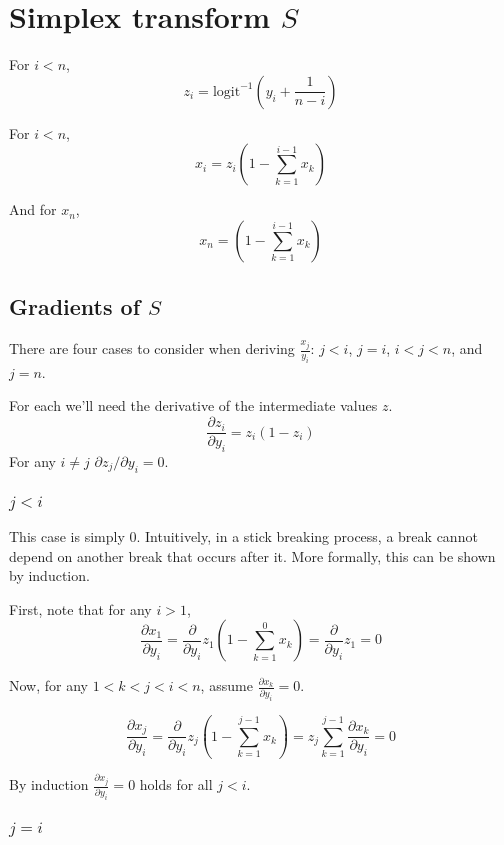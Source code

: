 \documentclass{article}
\begin{document}
\section{Simplex transform $S$}


For $i < n$,
$$z_i = \text{logit}^{-1}\left(y_i + \frac{1}{n - i}\right)$$

For $i < n$,
$$x_i = z_i \left(1 - \sum_{k=1}^{i-1} x_k \right)$$

And for $x_n$,
$$x_n = \left(1 - \sum_{k=1}^{i-1} x_k \right)$$


\subsection{Gradients of $S$}


There are four cases to consider when deriving $\frac{x_j}{y_i}$: $j < i$, $j =
i$, $i < j < n$, and  $j = n$.


For each we'll need the derivative of the intermediate values $z$.
\begin{equation}
\frac{\partial z_i}{\partial y_i} = z_i (1 - z_i)
\end{equation}
For any $i \neq j$ $\partial z_j / \partial y_i = 0$.


\subsubsection{$j < i$}
This case is simply 0. Intuitively, in a stick breaking process, a break cannot
depend on another break that occurs after it. More formally, this can be shown
by induction.

First, note that for any $i > 1$,
$$\frac{\partial x_1}{\partial y_i} = \frac{\partial}{\partial
y_i} z_1 \left(1 - \sum_{k=1}^0 x_k \right) = \frac{\partial}{\partial y_i} z_1 = 0$$

Now, for any $1 < k < j < i < n$, assume $\frac{\partial x_k}{\partial y_i} = 0$.

$$\frac{\partial x_j}{\partial y_i} = \frac{\partial}{\partial y_i} z_j \left(1 -
\sum_{k=1}^{j-1} x_k \right) = z_j \sum_{k=1}^{j-1} \frac{\partial x_k}{\partial y_i} = 0
$$

By induction $\frac{\partial x_j}{\partial y_i} = 0$ holds for all $j < i$.


\subsubsection{$j = i$}
\end{document}
